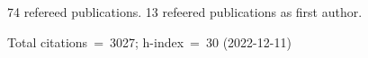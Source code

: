 74 refereed publications. 13 refeered publications as first author.

Total citations~=~3027; h-index~=~30 (2022-12-11)
